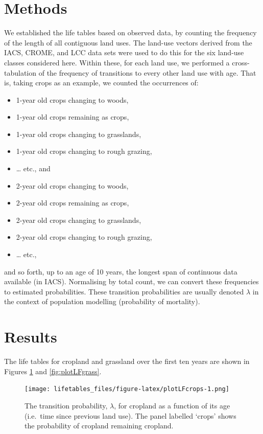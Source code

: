 \documentclass[
]{book}
\providecommand{\tightlist}{%
  \setlength{\itemsep}{0pt}\setlength{\parskip}{0pt}}
\begin{document}
\hypertarget{methods-4}{%
\section{Methods}\label{methods-4}}

We established the life tables based on observed data, by counting the frequency of the length of all contiguous land uses. The land-use vectors derived from the IACS, CROME, and LCC data sets were used to do this for the six land-use classes considered here.
Within these, for each land use, we performed a cross-tabulation of the frequency of transitions to every other land use with age.
That is, taking crops as an example, we counted the occurrences of:

\begin{itemize}
\tightlist
\item
  1-year old crops changing to woods,
\item
  1-year old crops remaining as crops,
\item
  1-year old crops changing to grasslands,
\item
  1-year old crops changing to rough grazing,
\item
  \ldots{} etc., and
\item
  2-year old crops changing to woods,
\item
  2-year old crops remaining as crops,
\item
  2-year old crops changing to grasslands,
\item
  2-year old crops changing to rough grazing,
\item
  \ldots{} etc.,
\end{itemize}

and so forth, up to an age of 10 years, the longest span of continuous data available (in IACS). Normalising by total count, we can convert these frequencies to estimated probabilities.
These transition probabilities are usually denoted \(\lambda\) in the context of population modelling (probability of mortality).

\hypertarget{results-4}{%
\section{Results}\label{results-4}}

The life tables for cropland and grassland over the first ten years are shown in Figures \ref{fig:plotLFcrops} and \ref{fig:plotLFgrass}.

\begin{figure}
\centering
\texttt{[image: lifetables\_files/figure-latex/plotLFcrops-1.png]}
\caption{\label{fig:plotLFcrops}The transition probability, \(\lambda\), for cropland as a function of its age (i.e.~time since previous land use). The panel labelled `crops' shows the probability of cropland remaining cropland.}
\end{figure}
\end{document}
